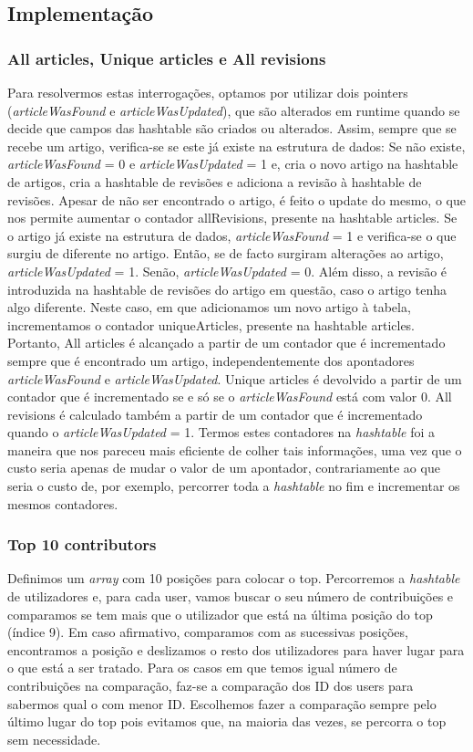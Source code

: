 \documentclass[a4paper]{article}
\begin{document}
\subsection{Implementação}

\subsubsection{All articles, Unique articles e All revisions}
Para resolvermos estas interrogações, optamos por utilizar dois pointers (\textit{articleWasFound} e \textit{articleWasUpdated}), que são alterados em runtime quando se decide que campos das hashtable são criados ou alterados.
Assim, sempre que se recebe um artigo, verifica-se se este já existe na estrutura de dados:
Se não existe, \textit{articleWasFound} = 0 e \textit{articleWasUpdated} = 1 e, cria o novo artigo na hashtable de artigos, cria a hashtable de revisões e adiciona a revisão à hashtable de revisões. Apesar de não ser encontrado o artigo, é feito o update do mesmo, o que nos permite aumentar o contador allRevisions, presente na hashtable articles.
Se o artigo já existe na estrutura de dados, \textit{articleWasFound} = 1 e verifica-se o que surgiu de diferente no artigo. Então, se de facto surgiram alterações ao artigo, \textit{articleWasUpdated} = 1. Senão, \textit{articleWasUpdated} = 0. Além disso, a revisão é introduzida na hashtable de revisões do artigo em questão, caso o artigo tenha algo diferente. Neste caso, em que adicionamos um novo artigo à tabela, incrementamos o contador uniqueArticles, presente na hashtable articles.
Portanto, All articles é alcançado a partir de um contador que é incrementado sempre que é encontrado um artigo, independentemente dos apontadores \textit{articleWasFound} e \textit{articleWasUpdated}. Unique articles é devolvido a partir de um contador que é incrementado se e só se o \textit{articleWasFound} está com valor 0. All revisions é calculado também a partir de um contador que é incrementado quando o \textit{articleWasUpdated} = 1.
Termos estes contadores na \textit{hashtable} foi a maneira que nos pareceu mais eficiente de colher tais informações, uma vez que o custo seria apenas de mudar o valor de um apontador, contrariamente ao que seria o custo de, por exemplo, percorrer toda a \textit{hashtable} no fim e incrementar os mesmos contadores.

\subsubsection{Top 10 contributors}
Definimos um \textit{array} com 10 posições para colocar o top. Percorremos a \textit{hashtable} de utilizadores e, para cada user, vamos buscar o seu número de contribuições e comparamos se tem mais que o utilizador que está na última posição do top (índice 9). Em caso afirmativo, comparamos com as sucessivas posições, encontramos a posição e deslizamos o resto dos utilizadores para haver lugar para o que está a ser tratado. Para os casos em que temos igual número de contribuições na comparação, faz-se a comparação dos ID dos users para sabermos qual o com menor ID.
Escolhemos fazer a comparação sempre pelo último lugar do top pois evitamos que, na maioria das vezes, se percorra o top sem necessidade.
\end{document}
